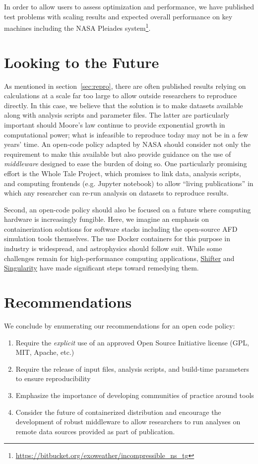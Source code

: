 \documentclass[12pt, titlepage]{aastex62}
\begin{document}
In order to allow users to assess optimization and performance, we have published test problems with scaling results and expected overall performance on key machines including the NASA Pleiades system\footnote{\url{https://bitbucket.org/exoweather/incompressible_ns_tg}}. 

\section{Looking to the Future}
\label{sec:future}

As mentioned in section~\ref{sec:repro}, there are often published results relying on calculations at a scale far too large to allow outside researchers to reproduce directly. In this case, we believe that the solution is to make datasets available along with analysis scripts and parameter files. The latter are particularly important should Moore's law continue to provide exponential growth in computational power; what is infeasible to reproduce today may not be in a few years' time. An open-code policy adapted by NASA should consider not only the requirement to make this available but also provide guidance on the use of \emph{middleware} designed to ease the burden of doing so. One particularly promising effort is the Whole Tale Project, which promises to link data, analysis scripts, and computing frontends (e.g. Jupyter notebook) to allow ``living publications'' in which any researcher can re-run analysis on datasets to reproduce results. 

Second, an open-code policy should also be focused on a future where computing hardware is increasingly fungible. Here, we imagine an emphasis on containerization solutions for software stacks including the open-source AFD simulation tools themselves. The use Docker containers for this purpose in industry is widespread, and astrophysics should follow suit. While some challenges remain for high-performance computing applications, \href{https://github.com/NERSC/shifter}{Shifter} and \href{http://singularity.lbl.gov/}{Singularity} have made significant steps toward remedying them. 

\section{Recommendations}
\label{sec:recommendations}
We conclude by enumerating our recommendations for an open code policy:
\begin{enumerate}
\item Require the \emph{explicit} use of an approved Open Source Initiative license (GPL, MIT, Apache, etc.)
\item Require the release of input files, analysis scripts, and build-time parameters to ensure reproducibility
\item Emphasize the importance of developing communities of practice around tools
\item Consider the future of containerized distribution and encourage the development of robust middleware to allow researchers to run analyses on remote data sources provided as part of publication.
\end{enumerate}

{\footnotesize

}
\end{document}
